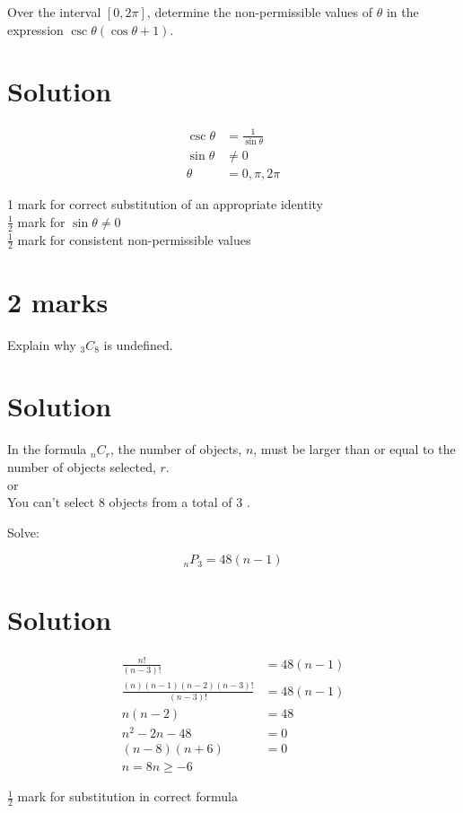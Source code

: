 \documentclass[10pt]{article}
\begin{document}
Over the interval $[0,2 \pi]$, determine the non-permissible values of $\theta$ in the expression $\csc \theta(\cos \theta+1)$.

\section*{Solution}
$$
\begin{aligned}
\csc \theta & =\frac{1}{\sin \theta} \\
\sin \theta & \neq 0 \\
\theta & =0, \pi, 2 \pi
\end{aligned}
$$

1 mark for correct substitution of an appropriate identity\\
$\frac{1}{2}$ mark for $\sin \theta \neq 0$\\
$\frac{1}{2}$ mark for consistent non-permissible values

\section*{2 marks}
Explain why ${ }_{3} C_{8}$ is undefined.

\section*{Solution}
In the formula ${ }_{n} C_{r}$, the number of objects, $n$, must be larger than or equal to the number of objects selected, $r$.\\
or\\
You can't select 8 objects from a total of 3 .

Solve:

$$
{ }_{n} P_{3}=48(n-1)
$$

\section*{Solution}
$$
\begin{aligned}
\frac{n!}{(n-3)!} & =48(n-1) \\
\frac{(n)(n-1)(n-2)(n-3)!}{(n-3)!} & =48(n-1) \\
n(n-2) & =48 \\
n^{2}-2 n-48 & =0 \\
(n-8)(n+6) & =0 \\
n=8 n \geq-6 &
\end{aligned}
$$

$\frac{1}{2}$ mark for substitution in correct formula
\end{document}
